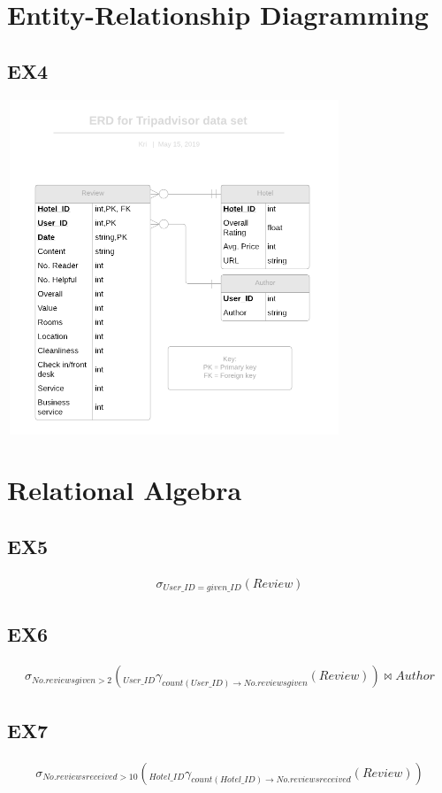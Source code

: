 \documentclass{article}
\begin{document}
	\section{Entity-Relationship Diagramming}
	
	\subsection{EX4}
	\includegraphics[width=10cm, height=10cm]{EX4_ERD_Tripadvisor.png}
	
	
	\section{Relational Algebra}
	
	\subsection{EX5}
	\begin{eqnarray}
	\sigma_{User\_ID = given\_ID}(Review)
	\end{eqnarray}
		
	\subsection{EX6}
	\begin{eqnarray}
	\sigma _{No. reviews given > 2}(_{User\_ID} \gamma _{count(User\_ID) \rightarrow No. reviews given}(Review)) \bowtie Author
	\end{eqnarray}
	
	\subsection{EX7}
	\begin{eqnarray}
		\sigma _{No. reviews received > 10}(_{Hotel\_ID} \gamma _{count(Hotel\_ID) \rightarrow No. reviews received}(Review))
	\end{eqnarray}
	
\end{document}
